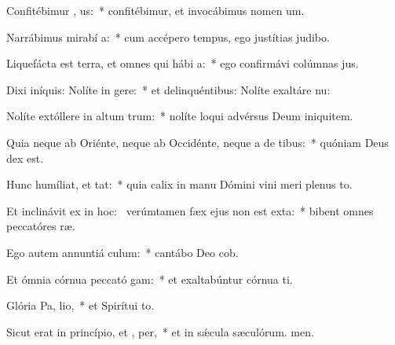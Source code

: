 \item Confitébimur , us:~* confitébimur, et invocábimus nomen um.
\item Narrábimus mirabí a:~* cum accépero tempus, ego justítias judibo.
\item Liquefácta est terra, et omnes qui hábi  a:~* ego confirmávi colúmnas jus.
\item Dixi iníquis: Nolíte in gere:~* et delinquéntibus: Nolíte exaltáre nu:
\item Nolíte extóllere in altum  trum:~* nolíte loqui advérsus Deum iniquitem.
\item Quia neque ab Oriénte, neque ab Occidénte, neque a de tibus:~* quóniam Deus dex est.
\item Hunc humíliat, et  tat:~* quia calix in manu Dómini vini meri plenus to.
\item Et inclinávit ex  in hoc:~\pscross{} verúmtamen fæx ejus non est exta:~* bibent omnes peccatóres ræ.
\item Ego autem annuntiá  culum:~* cantábo Deo cob.
\item Et ómnia córnua peccató gam:~* et exaltabúntur córnua ti.
\item Glória Pa,  lio,~* et Spirítui to.
\item Sicut erat in princípio, et ,  per,~* et in sǽcula sæculórum. men.
